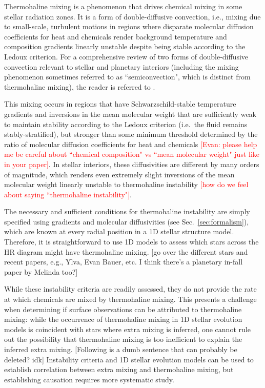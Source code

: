 Thermohaline mixing is a phenomenon that drives chemical mixing in some stellar radiation zones. 
It is a form of double-diffusive convection, i.e., mixing due to small-scale, turbulent motions in regions where disparate molecular diffusion coefficients for heat and chemicals render background temperature and composition gradients linearly unstable despite being stable according to the Ledoux criterion. 
For a comprehensive review of two forms of double-diffusive convection relevant to stellar and planetary interiors (including the mixing phenomenon sometimes referred to as ``semiconvection", which is distinct from thermohaline mixing), the reader is referred to \citet{garaud_DDC_review_2018}. 

This mixing occurs in regions that have Schwarzschild-stable temperature gradients and inversions in the mean molecular weight that are sufficiently weak to maintain stability according to the Ledoux criterion (i.e.~the fluid remains stably-stratified), but stronger than some minimum threshold determined by the ratio of molecular diffusion coefficients for heat and chemicals \textcolor{red}{[Evan: please help me be careful about ``chemical composition" vs ``mean molecular weight" just like in your paper]}. 
In stellar interiors, these diffusivities are different by many orders of magnitude, which renders even extremely slight inversions of the mean molecular weight linearly unstable to thermohaline instability \textcolor{red}{[how do we feel about saying ``thermohaline instability"]}.

The necessary and sufficient conditions for thermohaline instability are simply specified using gradients and molecular diffusivities (see Sec.~\ref{sec:formalism}), which are known at every radial position in a 1D stellar structure model. 
Therefore, it is straightforward to use 1D models to assess which stars across the HR diagram might have thermohaline mixing. [go over the different stars and recent papers, e.g., Ylva, Evan Bauer, etc. I think there's a planetary in-fall paper by Melinda too?]

While these instability criteria are readily assessed, they do not provide the rate at which chemicals are mixed by thermohaline mixing. 
This presents a challenge when determining if surface observations can be attributed to thermohaline mixing: while the occurrence of thermohaline mixing in 1D stellar evolution models is coincident with stars where extra mixing is inferred, one cannot rule out the possibility that thermohaline mixing is too inefficient to explain the inferred extra mixing. 
[Following is a dumb sentence that can probably be deleted? idk] Instability criteria and 1D stellar evolution models can be used to establish correlation between extra mixing and thermohaline mixing, but establishing causation requires more systematic study.

